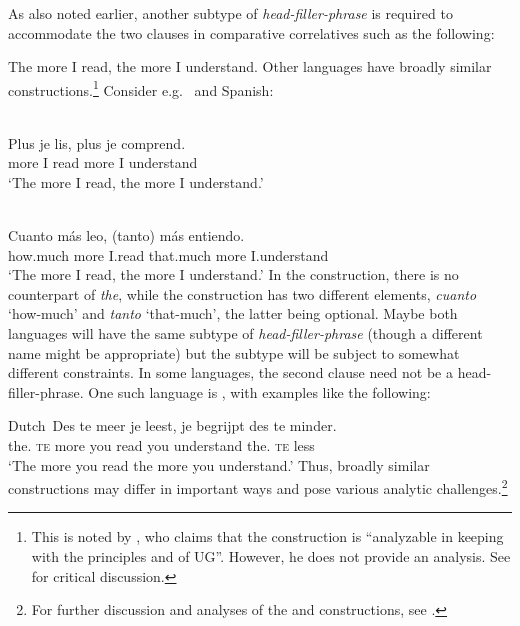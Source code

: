 \documentclass[output=paper]{langsci/langscibook}
\begin{document}
As also noted earlier, another subtype of \emph{head-filler-phrase} is required
to accommodate the two clauses in comparative correlatives such as the
following:

\ea\label{ex:key:4.17}
    The more I read, the more I understand.
\z
%
Other languages have broadly similar constructions.\footnote{This is noted by
    \citet[498]{denDikken2005b}, who claims that the construction is
    \enquote{analyzable in keeping with the principles and  of
    \gls{UG}}.  However, he does not provide an analysis. See
\textcite{AbeBor2008} for critical discussion.} Consider e.g.\  and
Spanish:

\ea\label{ex:key:4.18}\\
    \sn\gll Plus je lis, plus je comprend.\\
            more I read more I understand\\
    \glt    \enquote*{The more I read, the more I understand.}
\z

\ea\label{ex:key:4.19}\\
    \sn\gll Cuanto más leo, (tanto) más entiendo.\\
            how.much more I.read that.much more I.understand\\
    \glt    \enquote*{The more I read, the more I understand.}
\z
%
In the  construction, there is no counterpart of \emph{the}, while
the  construction has two different elements, \emph{cuanto} ‘how-much’
and \emph{tanto} ‘that-much’, the latter being optional. Maybe both languages
will have the same subtype of \emph{head-filler-phrase} (though a different
name might be appropriate) but the subtype will be subject to somewhat
different constraints. In some languages, the second clause need not be a
head-filler-phrase. One such language is , with examples like the
following:

\ea\label{ex:key:4.20}Dutch\
    \sn\gll Des te meer je leest, je begrijpt des te minder.\\
            the.\Gen{} \textsc{te} more you read you understand the.\Gen{} \textsc{te} less\\
    \glt    \enquote*{The more you read the more you understand.}
\z
%
Thus, broadly similar constructions may differ in important ways and pose
various analytic challenges.\footnote{For further discussion and analyses of
the \ili{French} and \ili{Spanish} constructions, see
\textcite{AbeBorEsp2006,AbeBor2008}.}
\end{document}
